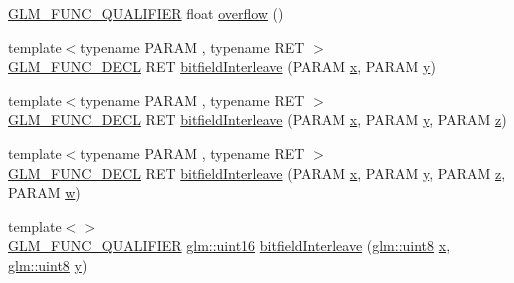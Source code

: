 \begin{DoxyCompactItemize}
\item 
\mbox{\hyperlink{setup_8hpp_a33fdea6f91c5f834105f7415e2a64407}{G\+L\+M\+\_\+\+F\+U\+N\+C\+\_\+\+Q\+U\+A\+L\+I\+F\+I\+ER}} float \mbox{\hyperlink{namespaceglm_1_1detail_a61efe122333bc00e81c57e0927bfdfb3}{overflow}} ()
\item 
{\footnotesize template$<$typename P\+A\+R\+AM , typename R\+ET $>$ }\\\mbox{\hyperlink{setup_8hpp_ab2d052de21a70539923e9bcbf6e83a51}{G\+L\+M\+\_\+\+F\+U\+N\+C\+\_\+\+D\+E\+CL}} R\+ET \mbox{\hyperlink{namespaceglm_1_1detail_a39644ee418ae41e3393d1cb6191e32a7}{bitfield\+Interleave}} (P\+A\+R\+AM \mbox{\hyperlink{_s_d_l__opengl_8h_ad0e63d0edcdbd3d79554076bf309fd47}{x}}, P\+A\+R\+AM \mbox{\hyperlink{_s_d_l__opengl_8h_a1675d9d7bb68e1657ff028643b4037e3}{y}})
\item 
{\footnotesize template$<$typename P\+A\+R\+AM , typename R\+ET $>$ }\\\mbox{\hyperlink{setup_8hpp_ab2d052de21a70539923e9bcbf6e83a51}{G\+L\+M\+\_\+\+F\+U\+N\+C\+\_\+\+D\+E\+CL}} R\+ET \mbox{\hyperlink{namespaceglm_1_1detail_aa2fdd8f720417a13990873ba704a3426}{bitfield\+Interleave}} (P\+A\+R\+AM \mbox{\hyperlink{_s_d_l__opengl_8h_ad0e63d0edcdbd3d79554076bf309fd47}{x}}, P\+A\+R\+AM \mbox{\hyperlink{_s_d_l__opengl_8h_a1675d9d7bb68e1657ff028643b4037e3}{y}}, P\+A\+R\+AM \mbox{\hyperlink{_s_d_l__opengl__glext_8h_a5e74030ebb3297ce1b37ff716fedd68f}{z}})
\item 
{\footnotesize template$<$typename P\+A\+R\+AM , typename R\+ET $>$ }\\\mbox{\hyperlink{setup_8hpp_ab2d052de21a70539923e9bcbf6e83a51}{G\+L\+M\+\_\+\+F\+U\+N\+C\+\_\+\+D\+E\+CL}} R\+ET \mbox{\hyperlink{namespaceglm_1_1detail_a606f6dc8c8314159fafef68f820c2c65}{bitfield\+Interleave}} (P\+A\+R\+AM \mbox{\hyperlink{_s_d_l__opengl_8h_ad0e63d0edcdbd3d79554076bf309fd47}{x}}, P\+A\+R\+AM \mbox{\hyperlink{_s_d_l__opengl_8h_a1675d9d7bb68e1657ff028643b4037e3}{y}}, P\+A\+R\+AM \mbox{\hyperlink{_s_d_l__opengl__glext_8h_a5e74030ebb3297ce1b37ff716fedd68f}{z}}, P\+A\+R\+AM \mbox{\hyperlink{_s_d_l__opengl__glext_8h_a6ee8f168a7ab6785a9bb57c6715dad99}{w}})
\item 
{\footnotesize template$<$$>$ }\\\mbox{\hyperlink{setup_8hpp_a33fdea6f91c5f834105f7415e2a64407}{G\+L\+M\+\_\+\+F\+U\+N\+C\+\_\+\+Q\+U\+A\+L\+I\+F\+I\+ER}} \mbox{\hyperlink{group__gtc__type__precision_gad8c2939e1fdd8e5828b31d95c52255d5}{glm\+::uint16}} \mbox{\hyperlink{namespaceglm_1_1detail_ac59c574dc7900d87786f5a96f82ea6e7}{bitfield\+Interleave}} (\mbox{\hyperlink{group__gtc__type__precision_ga1a7dcd8aac97cc8020817c94049deff2}{glm\+::uint8}} \mbox{\hyperlink{_s_d_l__opengl_8h_ad0e63d0edcdbd3d79554076bf309fd47}{x}}, \mbox{\hyperlink{group__gtc__type__precision_ga1a7dcd8aac97cc8020817c94049deff2}{glm\+::uint8}} \mbox{\hyperlink{_s_d_l__opengl_8h_a1675d9d7bb68e1657ff028643b4037e3}{y}})

\end{DoxyCompactItemize}
